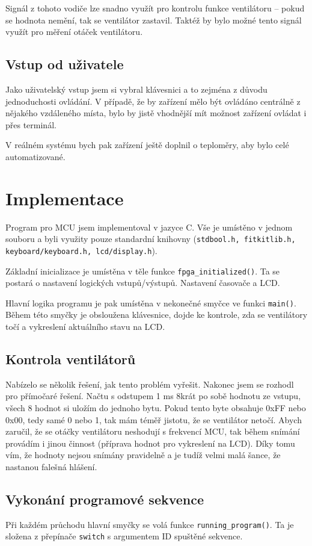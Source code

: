 \documentclass[11pt,a4paper,onecolumn,notitlepage]{article}
\begin{document}
	Signál z tohoto vodiče lze snadno využít pro kontrolu funkce ventilátoru -- pokud se hodnota nemění, tak se ventilátor zastavil. Taktéž by bylo možné tento signál využít pro měření otáček ventilátoru.

	\subsection{Vstup od uživatele}
	Jako uživatelský vstup jsem si vybral klávesnici a to zejména z důvodu jednoduchosti ovládání. V případě, že by zařízení mělo být ovládáno centrálně z nějakého vzdáleného místa, bylo by jistě vhodnější mít možnost zařízení ovládat i přes terminál.
	
	V reálném systému bych pak zařízení ještě doplnil o teploměry, aby bylo celé automatizované.
	
	
\section{Implementace}
Program pro MCU jsem implementoval v jazyce C. Vše je umístěno v jednom souboru a byli využity pouze standardní knihovny (\texttt{stdbool.h, fitkitlib.h, keyboard/keyboard.h, lcd/display.h}).

Základní inicializace je umístěna v těle funkce \texttt{fpga\_initialized()}. Ta se postará o nastavení logických vstupů/výstupů. Nastavení časovače a LCD.

Hlavní logika programu je pak umístěna v nekonečné smyčce ve funkci \texttt{main()}. Během této smyčky je obsloužena klávesnice, dojde ke kontrole, zda se ventilátory točí a vykreslení aktuálního stavu na LCD.

	\subsection{Kontrola ventilátorů}
	Nabízelo se několik řešení, jak tento problém vyřešit. Nakonec jsem se rozhodl pro přímočaré řešení. Načtu s odstupem 1 ms 8krát po sobě hodnotu ze vstupu, všech 8 hodnot si uložím do jednoho bytu. Pokud tento byte obsahuje 0xFF nebo 0x00, tedy samé 0 nebo 1, tak mám téměř jistotu, že se ventilátor netočí. Abych zaručil, že se otáčky ventilátoru neshodují s frekvencí MCU, tak během snímání provádím i jinou činnost (příprava hodnot pro vykreslení na LCD). Díky tomu vím, že hodnoty nejsou snímány pravidelně a je tudíž velmi malá šance, že nastanou falešná hlášení.
	
	\subsection{Vykonání programové sekvence}
	Při každém průchodu hlavní smyčky se volá funkce \texttt{running\_program()}. Ta je složena z přepínače \texttt{switch} s argumentem ID spuštěné sekvence.
	
\end{document}
